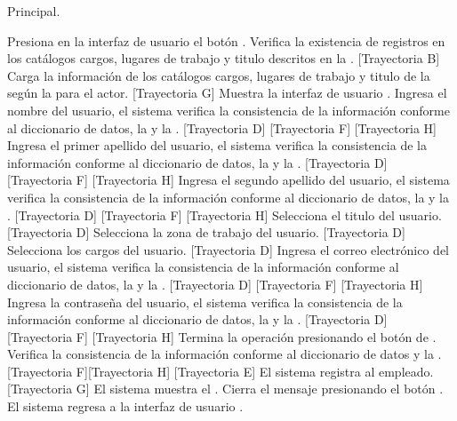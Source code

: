 \begin{UCtrayectoria}{Principal.}
	
	\UCpaso[\UCactor] Presiona en la interfaz de usuario  el botón \IUbutton{+}.
	\UCpaso  Verifica la existencia de registros en los catálogos cargos, lugares de trabajo y titulo descritos en la . [Trayectoria B] 
	\UCpaso Carga la información de los catálogos cargos, lugares de trabajo y titulo de la  según la  para el actor. [Trayectoria G]
	\UCpaso Muestra la interfaz de usuario  . 
	\UCpaso[\UCactor] Ingresa el nombre del usuario, el sistema verifica la consistencia de la información conforme al diccionario de datos, la   y la .  [Trayectoria D] [Trayectoria F]  [Trayectoria H] 
	\UCpaso[\UCactor] Ingresa el primer apellido del usuario, el sistema verifica la consistencia de la información conforme al diccionario de datos, la   y la .  [Trayectoria D] [Trayectoria F]  [Trayectoria H] 
	\UCpaso[\UCactor] Ingresa el segundo apellido del usuario, el sistema verifica la consistencia de la información conforme al diccionario de datos, la   y la .  [Trayectoria D] [Trayectoria F]  [Trayectoria H] 
	\UCpaso[\UCactor] Selecciona el titulo del usuario.  [Trayectoria D]
	\UCpaso[\UCactor] Selecciona la zona de trabajo del usuario. [Trayectoria D]
	\UCpaso[\UCactor] Selecciona los cargos del usuario. [Trayectoria D]    
	\UCpaso[\UCactor] Ingresa el correo electrónico del usuario, el sistema verifica la consistencia de la información conforme al diccionario de datos, la   y la .  [Trayectoria D] [Trayectoria F]  [Trayectoria H] 
	\UCpaso[\UCactor] Ingresa la contraseña del usuario, el sistema verifica la consistencia de la información conforme al diccionario de datos, la   y la .  [Trayectoria D] [Trayectoria F]  [Trayectoria H] 
	\UCpaso[\UCactor]  Termina la operación presionando el botón de . 
	\UCpaso Verifica la consistencia de la información conforme al diccionario de datos y la .  [Trayectoria F][Trayectoria H] [Trayectoria E]
	\UCpaso El sistema registra al empleado. [Trayectoria G]
	\UCpaso  El sistema muestra el .    
	\UCpaso[\UCactor] Cierra el mensaje presionando el botón .
	\UCpaso El sistema regresa a la interfaz de usuario .
\end{UCtrayectoria}


